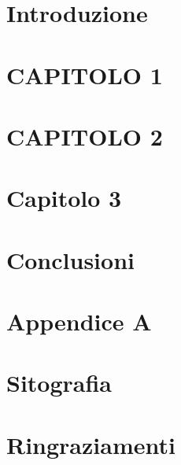 \documentclass[14pt]{extreport}
\begin{document}





\chapter*{Introduzione}

\setcounter{page}{1} 		



\chapter{CAPITOLO 1}

\chapter{CAPITOLO 2}

\chapter{Capitolo 3}

\chapter*{Conclusioni}

\chapter*{Appendice A}


\chapter*{Sitografia}

\chapter*{Ringraziamenti}

\end{document}
